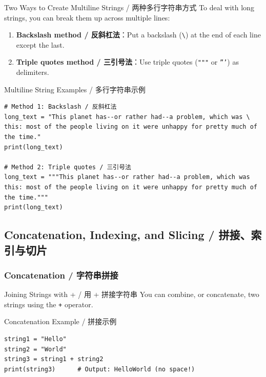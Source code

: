 \documentclass[11pt,a4paper]{report}
\let\oldtexttt\texttt
\renewcommand{\texttt}[1]{\textcolor{mainblue}{\oldtexttt{#1}}}
\begin{document}
\begin{concept}{Two Ways to Create Multiline Strings / 两种多行字符串方式}
    To deal with long strings, you can break them up across multiple lines:
    \begin{enumerate}[itemsep=0.3em]
        \item \textbf{Backslash method / 反斜杠法}：Put a backslash (\texttt{\textbackslash}) at the end of each line except the last.
        \item \textbf{Triple quotes method / 三引号法}：Use triple quotes (\texttt{"""} or \texttt{'''}) as delimiters.
    \end{enumerate}
\end{concept}

\begin{examplebox}{Multiline String Examples / 多行字符串示例}
\begin{lstlisting}
# Method 1: Backslash / 反斜杠法
long_text = "This planet has--or rather had--a problem, which was \
this: most of the people living on it were unhappy for pretty much of the time."
print(long_text)

# Method 2: Triple quotes / 三引号法
long_text = """This planet has--or rather had--a problem, which was
this: most of the people living on it were unhappy for pretty much of the time."""
print(long_text)
\end{lstlisting}
\end{examplebox}

\subsection{Concatenation, Indexing, and Slicing / 拼接、索引与切片}

\subsubsection{Concatenation / 字符串拼接}
\begin{concept}{Joining Strings with + / 用 + 拼接字符串}
    You can combine, or concatenate, two strings using the \texttt{+} operator.
\end{concept}

\begin{examplebox}{Concatenation Example / 拼接示例}
\begin{lstlisting}
string1 = "Hello"
string2 = "World"
string3 = string1 + string2
print(string3)      # Output: HelloWorld (no space!)
\end{lstlisting}
\end{examplebox}
\end{document}
